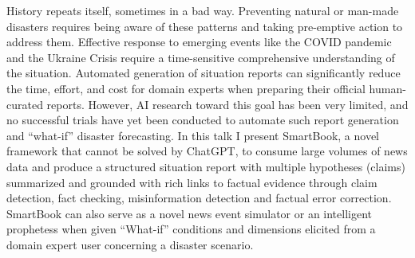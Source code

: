 History repeats itself, sometimes in a bad way. Preventing natural or man-made disasters requires being aware of these patterns and taking pre-emptive action to address them. Effective response to emerging events like the COVID pandemic and the Ukraine Crisis require a time-sensitive comprehensive understanding of the situation. Automated generation of situation reports can significantly reduce the time, effort, and cost for domain experts when preparing their official human-curated reports. However, AI research toward this goal has been very limited, and no successful trials have yet been conducted to automate such report generation and “what-if” disaster forecasting. In this talk I present SmartBook, a novel framework that cannot be solved by ChatGPT, to consume large volumes of news data and produce a structured situation report with multiple hypotheses (claims) summarized and grounded with rich links to factual evidence through claim detection, fact checking, misinformation detection and factual error correction. SmartBook can also serve as a novel news event simulator or an intelligent prophetess when given “What-if” conditions and dimensions elicited from a domain expert user concerning a disaster scenario.
